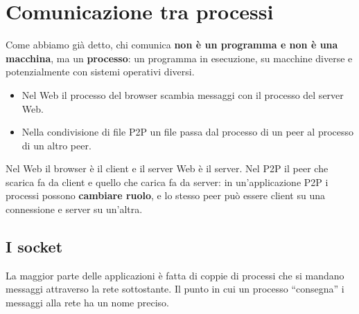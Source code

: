 \section{Comunicazione tra processi}

Come abbiamo già detto, chi comunica \textbf{non è un programma e non è una macchina}, ma un
\textbf{processo}: un programma in esecuzione, su macchine diverse e potenzialmente con sistemi operativi diversi.

\begin{itemize}
    \item Nel Web il processo del browser scambia messaggi con il processo del server Web.
    \item Nella condivisione di file P2P un file passa dal processo di un peer al processo di un altro peer.
\end{itemize}


Nel Web il browser è il client e il server Web è il server. Nel P2P il peer che scarica fa da
client e quello che carica fa da server: in un'applicazione P2P i processi possono
\textbf{cambiare ruolo}, e lo stesso peer può essere client su una connessione e server su un'altra.

\subsection{I socket}

La maggior parte delle applicazioni è fatta di coppie di processi che si mandano messaggi
attraverso la rete sottostante. Il punto in cui un processo ``consegna'' i messaggi alla rete ha un
nome preciso.


